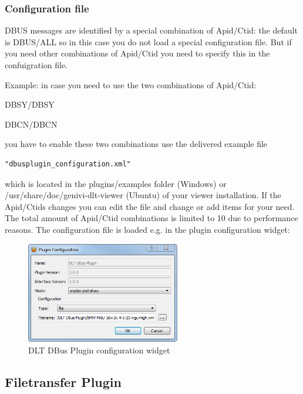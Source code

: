 \documentclass[a4paper,11pt]{article}
\begin{document}
\subsubsection{Configuration file}

DBUS messages are identified by a special combination of Apid/Ctid: the default is DBUS/ALL so in this case you do not load a special configuration file.\linebreak
But if you need other combinations of Apid/Ctid you need to specify this in the confuigration file.

Example: in case you need to use the two combinations of Apid/Ctid:

DBSY/DBSY

DBCN/DBCN


you have to enable these two combinations use the delivered example file \begin{verbatim}"dbusplugin_configuration.xml" \end{verbatim}
which is located in the plugins/examples folder (Windows) or /usr/share/doc/genivi-dlt-viewer (Ubuntu) of your viewer installation.
If the Apid/Ctids changes you can edit the file and change or add items for your need. The total amount of Apid/Ctid combinations
is limited to 10 due to performance reasons.\linebreak
The configuration file is loaded e.g. in the plugin configuration widget:


\begin{figure}[H]
 \centering
 \includegraphics[width=0.6\textwidth]{images/dbus_configure.png}
 \caption{DLT DBus Plugin configuration widget}
 \label{fig:dbuspluginconfigurationwidget}
\end{figure}

\subsection{Filetransfer Plugin}
\end{document}
